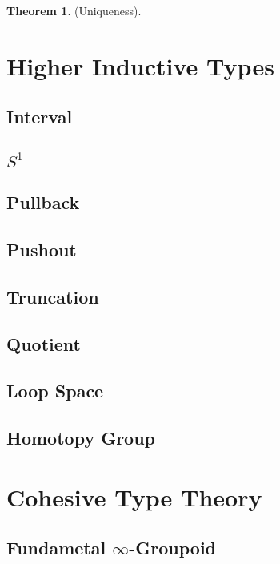 \documentclass{article}
\theoremstyle{definition}
\newtheorem{theorem}{Theorem}
\begin{document}
\begin{theorem} (Uniqueness).
\end{theorem}

\section{Higher Inductive Types}

\subsection{Interval}

\subsection{$S^1$}

\subsection{Pullback}

\subsection{Pushout}

\subsection{Truncation}

\subsection{Quotient}

\subsection{Loop Space}

\subsection{Homotopy Group}

\section{Cohesive Type Theory}

\subsection{Fundametal $\infty$-Groupoid}
\end{document}
